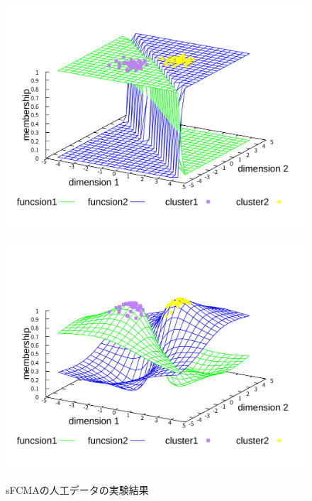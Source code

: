 \documentclass[twocolumn, a4paper]{icethesisabst}
\begin{document}
\begin{figure}[htbp]
 \centering
 \begin{minipage}{0.43\hsize}
  \includegraphics[width=\linewidth]{sFCMA-Em11.pdf}
  \label{fig:sFCMA-Em11}
 \end{minipage}
 \begin{minipage}{0.43\hsize}
  \includegraphics[width=\linewidth]{sFCMA-Em2.pdf}
  \label{fig:sFCMA-Em2}
 \end{minipage}
 \caption{sFCMAの人工データの実験結果}
\end{figure}
\end{document}
